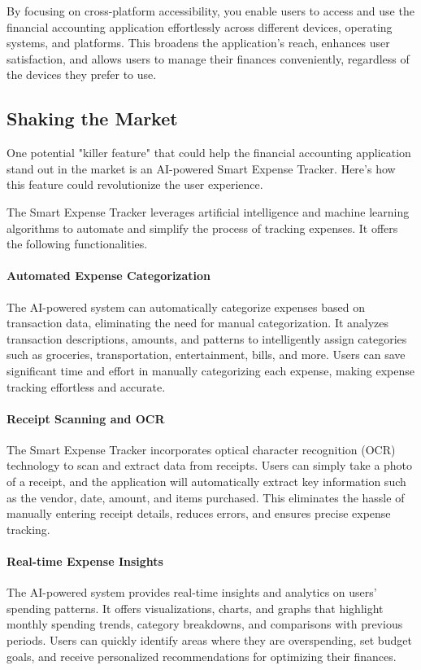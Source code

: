 By focusing on cross-platform accessibility, you enable users to access and use the financial accounting application 
effortlessly across different devices, operating systems, and platforms. This broadens the application's reach, 
enhances user satisfaction, and allows users to manage their finances conveniently, regardless of the devices they 
prefer to use.


\subsection{Shaking the Market}

One potential "killer feature" that could help the financial accounting application stand out in the market is 
an AI-powered Smart Expense Tracker. Here's how this feature could revolutionize the user experience.

The Smart Expense Tracker leverages artificial intelligence and machine learning algorithms to automate and 
simplify the process of tracking expenses. It offers the following functionalities.

\paragraph{Automated Expense Categorization}
The AI-powered system can automatically categorize expenses based on transaction data, eliminating the need 
for manual categorization. It analyzes transaction descriptions, amounts, and patterns to intelligently assign 
categories such as groceries, transportation, entertainment, bills, and more. Users can save significant time 
and effort in manually categorizing each expense, making expense tracking effortless and accurate.

\paragraph{Receipt Scanning and OCR}
The Smart Expense Tracker incorporates optical character recognition (OCR) technology to scan and extract data 
from receipts. Users can simply take a photo of a receipt, and the application will automatically extract key 
information such as the vendor, date, amount, and items purchased. This eliminates the hassle of manually entering 
receipt details, reduces errors, and ensures precise expense tracking.

\paragraph{Real-time Expense Insights}
The AI-powered system provides real-time insights and analytics on users' spending patterns. It offers visualizations, 
charts, and graphs that highlight monthly spending trends, category breakdowns, and comparisons with previous periods. 
Users can quickly identify areas where they are overspending, set budget goals, and receive personalized 
recommendations for optimizing their finances.

